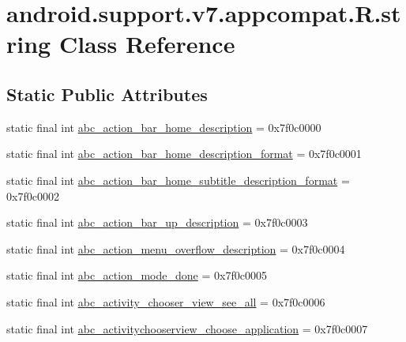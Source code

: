 \hypertarget{classandroid_1_1support_1_1v7_1_1appcompat_1_1R_1_1string}{}\section{android.\+support.\+v7.\+appcompat.\+R.\+string Class Reference}
\label{classandroid_1_1support_1_1v7_1_1appcompat_1_1R_1_1string}
\subsection*{Static Public Attributes}
\begin{DoxyCompactItemize}
\item 
static final int \mbox{\hyperlink{classandroid_1_1support_1_1v7_1_1appcompat_1_1R_1_1string_ab2d2b1d0da0214cbe08414e3b8aeead9}{abc\+\_\+action\+\_\+bar\+\_\+home\+\_\+description}} = 0x7f0c0000
\item 
static final int \mbox{\hyperlink{classandroid_1_1support_1_1v7_1_1appcompat_1_1R_1_1string_ad59fccdbb8ada7347f02ffdb92d7da9c}{abc\+\_\+action\+\_\+bar\+\_\+home\+\_\+description\+\_\+format}} = 0x7f0c0001
\item 
static final int \mbox{\hyperlink{classandroid_1_1support_1_1v7_1_1appcompat_1_1R_1_1string_ab301aa506d8cfcf2cb74a816212deb90}{abc\+\_\+action\+\_\+bar\+\_\+home\+\_\+subtitle\+\_\+description\+\_\+format}} = 0x7f0c0002
\item 
static final int \mbox{\hyperlink{classandroid_1_1support_1_1v7_1_1appcompat_1_1R_1_1string_a3a4f65bf9f2bdae055c146bca7613520}{abc\+\_\+action\+\_\+bar\+\_\+up\+\_\+description}} = 0x7f0c0003
\item 
static final int \mbox{\hyperlink{classandroid_1_1support_1_1v7_1_1appcompat_1_1R_1_1string_a3985456499fd328f556a626481695499}{abc\+\_\+action\+\_\+menu\+\_\+overflow\+\_\+description}} = 0x7f0c0004
\item 
static final int \mbox{\hyperlink{classandroid_1_1support_1_1v7_1_1appcompat_1_1R_1_1string_ab47aea7d6f590078f9b103b739084828}{abc\+\_\+action\+\_\+mode\+\_\+done}} = 0x7f0c0005
\item 
static final int \mbox{\hyperlink{classandroid_1_1support_1_1v7_1_1appcompat_1_1R_1_1string_a251b3261b9f1bd9fe85117e02d81d6a8}{abc\+\_\+activity\+\_\+chooser\+\_\+view\+\_\+see\+\_\+all}} = 0x7f0c0006
\item 
static final int \mbox{\hyperlink{classandroid_1_1support_1_1v7_1_1appcompat_1_1R_1_1string_a90f4fe7b227c4fbf744928e926fbea60}{abc\+\_\+activitychooserview\+\_\+choose\+\_\+application}} = 0x7f0c0007

\end{DoxyCompactItemize}
